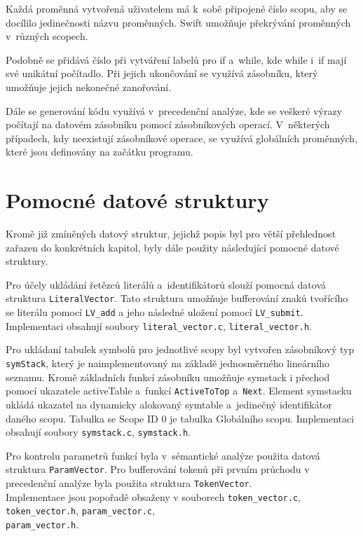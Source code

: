 \documentclass[11pt]{article}
\begin{document}
Každá proměnná vytvořená uživatelem má k~sobě připojené číslo scopu, aby se docílilo jedinečnosti názvu proměnných.
Swift umožňuje překrývání proměnných v~různých scopech.

Podobně se přidává číslo při vytváření labelů pro if a~while, kde while i~if mají své unikátní počítadlo.
Při jejich ukončování se využívá zásobníku, který umožňuje jejich nekonečné zanořování.


Dále se generování kódu využívá v~precedenční analýze, kde se veškeré výrazy počítají na datovém zásobníku pomocí zásobníkových operací.
V~některých případech, kdy neexistují zásobníkové operace, se využívá globálních proměnných, které jsou definovány na začátku programu.


\section{Pomocné datové struktury}

Kromě již zmíněných datový struktur, jejichž popis byl pro větší přehlednost zařazen do
konkrétních kapitol, byly dále použity následující pomocné datové struktury.

Pro účely ukládání řetězců literálů a~identifikátorů slouží pomocná datová struktura \texttt{LiteralVector}.
Tato struktura umožňuje bufferování znaků tvořícího se literálu pomocí
\texttt{LV\_add} a jeho následné uložení pomocí \texttt{LV\_submit}.
Implementaci obsahují soubory \texttt{literal\_vector.c}, \texttt{literal\_vector.h}.

Pro ukládaní tabulek symbolů pro jednotlivé scopy byl vytvořen zásobníkový typ \texttt{symStack},
který je naimplementovaný na základě jednosměrného lineárního seznamu. Kromě základních funkcí
zásobníku umožňuje symstack i přechod pomocí ukazatele activeTable a~funkcí \texttt{ActiveToTop} a~\texttt{Next}.
Element symstacku ukládá ukazatel na dynamicky alokovaný symtable a~jedinečný identifikátor daného scopu.
Tabulka se Scope ID 0 je tabulka Globálního scopu.
Implementaci obsahují soubory \texttt{symstack.c}, \texttt{symstack.h}.

Pro kontrolu parametrů funkcí byla v~sémantické analýze použita datová struktura \texttt{ParamVector}.
Pro bufferování tokenů při prvním průchodu v precedenční analýze byla použita struktura \texttt{TokenVector}.\\
Implementace jsou popořadě obsaženy v souborech
\texttt{token\_vector.c}, \texttt{token\_vector.h}, \texttt{param\_vector.c}, \\ \texttt{param\_vector.h}.
\end{document}
